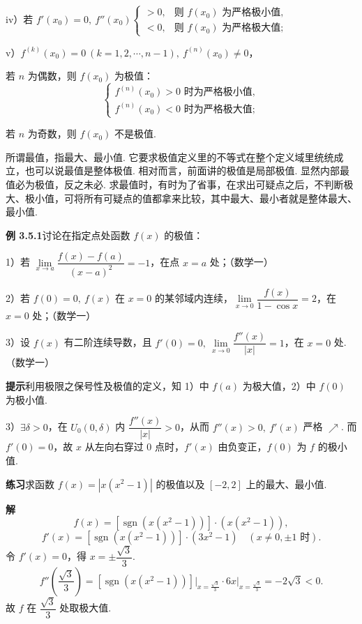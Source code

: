 \documentclass[UTF8, 12pt, fontset=fandol, oneside]{ctexart}
\begin{document}
iv）若 $f'(x_0)=0,\ f''(x_0)
\begin{cases}
>0, & \text{则 }f(x_0)\text{ 为严格极小值},\\
<0, & \text{则 }f(x_0)\text{ 为严格极大值};
\end{cases}$

v）$f^{(k)}(x_0)=0\ (k=1,2,\cdots,n-1),\ f^{(n)}(x_0)\ne0$，

若 $n$ 为偶数，则 $f(x_0)$ 为极值：
\[
\begin{cases}
f^{(n)}(x_0)>0\text{ 时为严格极小值},\\
f^{(n)}(x_0)<0\text{ 时为严格极大值};
\end{cases}
\]

若 $n$ 为奇数，则 $f(x_0)$ 不是极值.

所谓最值，指最大、最小值. 它要求极值定义里的不等式在整个定义域里统统成立，也可以说最值是整体极值. 相对而言，前面讲的极值是局部极值. 显然内部最值必为极值，反之未必. 求最值时，有时为了省事，在求出可疑点之后，不判断极大、极小值，可将所有可疑点的值都拿来比较，其中最大、最小者就是整体最大、最小值.

\noindent\textbf{例 3.5.1}\quad 讨论在指定点处函数 $f(x)$ 的极值：

1）若 $\lim\limits_{x\to a}\dfrac{f(x)-f(a)}{(x-a)^2}=-1$，在点 $x=a$ 处；（数学一）

2）若 $f(0)=0,\ f(x)$ 在 $x=0$ 的某邻域内连续，$\lim\limits_{x\to0}\dfrac{f(x)}{1-\cos x}=2$，在 $x=0$ 处；（数学一）

3）设 $f(x)$ 有二阶连续导数，且 $f'(0)=0,\ \lim\limits_{x\to0}\dfrac{f''(x)}{|x|}=1$，在 $x=0$ 处.（数学一）

\noindent\textbf{提示}\quad 利用极限之保号性及极值的定义，知 1）中 $f(a)$ 为极大值，2）中 $f(0)$ 为极小值.

3）$\exists\delta>0$，在 $U_0(0,\delta)$ 内 $\dfrac{f''(x)}{|x|}>0$，从而 $f''(x)>0,\ f'(x)$ 严格 $\nearrow$. 而 $f'(0)=0$，故 $x$ 从左向右穿过 0 点时，$f'(x)$ 由负变正，$f(0)$ 为 $f$ 的极小值.

\noindent\textbf{练习}\quad 求函数 $f(x)=|x(x^2-1)|$ 的极值以及 $[-2,2]$ 上的最大、最小值.

\noindent\textbf{解}\quad
\[
  f(x)=[\operatorname{sgn}(x(x^2-1))]\cdot(x(x^2-1)),
\]
\[
  f'(x)=[\operatorname{sgn}(x(x^2-1))]\cdot(3x^2-1)\quad(x\ne0,\pm1\text{ 时}).
\]
令 $f'(x)=0$，得 $x=\pm\dfrac{\sqrt3}{3}$.
\[
  f''\left(\frac{\sqrt3}{3}\right)
  =[\operatorname{sgn}(x(x^2-1))]\bigg|_{x=\frac{\sqrt3}{3}}\cdot6x\bigg|_{x=\frac{\sqrt3}{3}}
  =-2\sqrt3<0.
\]
故 $f$ 在 $\dfrac{\sqrt3}{3}$ 处取极大值.
\end{document}
